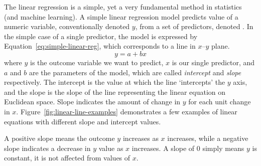 The linear regression is a simple,
yet a very fundamental method in statistics (and machine learning).
A simple linear regression model predicts value of
a numeric variable, conventionally denoted $y$,
from a set of predictors, denoted .%
In the simple case of a single predictor,
the model is expressed by Equation~\ref{eq:simple-linear-reg},
which corresponds to a line in $x$--$y$ plane.
\begin{equation}\label{eq:simple-linear-reg}
  y = a +  b x
\end{equation}
where $y$ is the outcome variable we want to predict,
$x$ is our single predictor,
and $a$ and $b$ are the parameters of the model,
which are called \emph{intercept} and \emph{slope} respectively.%
The intercept is the value at which the line `intercepts' the $y$ axis,
and the slope is the slope of the line
representing the linear equation on Euclidean space.
Slope indicates the amount of change in $y$
for each unit change in $x$.
Figure~\ref{fig:linear-line-examples} demonstrates
a few examples of linear equations with different slope and intercept values.
\begin{marginfigure}
  \caption{\label{fig:linear-line-examples}%
    Example instances of Equation~\ref{eq:simple-linear-reg}.
  }
\end{marginfigure}
A positive slope means the outcome $y$ increases as $x$ increases,
while a negative slope indicates a decrease in $y$ value as $x$ increases.  
A slope of $0$ simply means $y$ is constant,
it is not affected from values of $x$.

